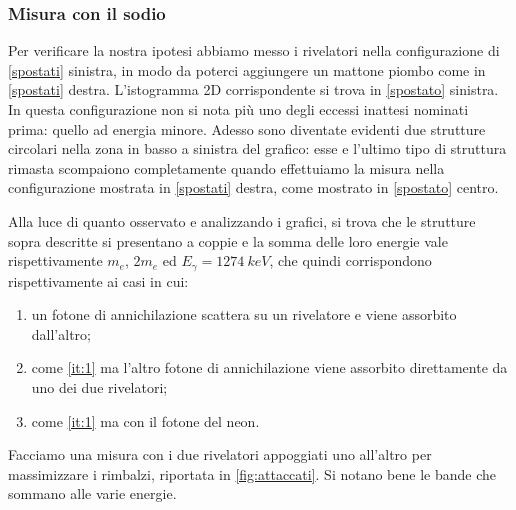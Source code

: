 \subsubsection{Misura con il sodio}

Per verificare la nostra ipotesi abbiamo messo i rivelatori nella configurazione di \autoref{spostati} sinistra, in modo da poterci aggiungere un mattone piombo come in \autoref{spostati} destra.
L'istogramma 2D corrispondente si trova in \autoref{spostato} sinistra.
In questa configurazione non si nota più uno degli eccessi inattesi nominati prima: quello ad energia minore.
Adesso sono diventate evidenti due strutture circolari nella zona in basso a sinistra del grafico: esse e l'ultimo tipo di struttura rimasta scompaiono completamente quando effettuiamo la misura nella configurazione mostrata in \autoref{spostati} destra, come mostrato in \autoref{spostato} centro.

Alla luce di quanto osservato e analizzando i grafici, si trova che le strutture sopra descritte si presentano a coppie e la somma delle loro energie vale rispettivamente $m_e$, $2m_e$ ed $E_{\gamma}=\SI{1274}{keV}$,
che quindi corrispondono rispettivamente ai casi in cui:
\begin{enumerate}
	\item un fotone di annichilazione scattera su un rivelatore e viene assorbito dall'altro; \label{it:1}
	\item come \ref{it:1} ma l'altro fotone di annichilazione viene assorbito direttamente da uno dei due rivelatori;
	\item come \ref{it:1} ma con il fotone del neon.
\end{enumerate}
Facciamo una misura con i due rivelatori appoggiati uno all'altro
per massimizzare i rimbalzi, riportata in \autoref{fig:attaccati}.
Si notano bene le bande che sommano alle varie energie.

